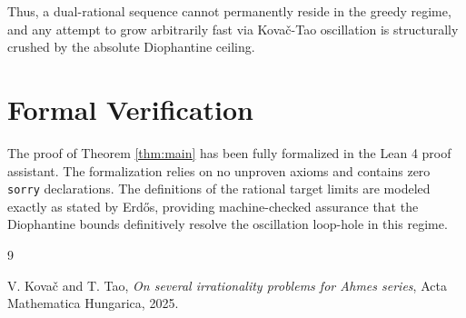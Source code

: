 \documentclass[11pt,reqno]{amsart}
\theoremstyle{definition}
\begin{document}
Thus, a dual-rational sequence cannot permanently reside in the greedy regime, and any attempt to grow arbitrarily fast via Kova\v{c}-Tao oscillation is structurally crushed by the absolute Diophantine ceiling.

\section{Formal Verification}

The proof of Theorem \ref{thm:main} has been fully formalized in the Lean 4 proof assistant. The formalization relies on no unproven axioms and contains zero \texttt{sorry} declarations. The definitions of the rational target limits are modeled exactly as stated by Erd\H{o}s, providing machine-checked assurance that the Diophantine bounds definitively resolve the oscillation loop-hole in this regime.

\begin{thebibliography}{9}

V. Kova\v{c} and T. Tao, 
\textit{On several irrationality problems for Ahmes series},
Acta Mathematica Hungarica, 2025.

\end{thebibliography}
\end{document}
